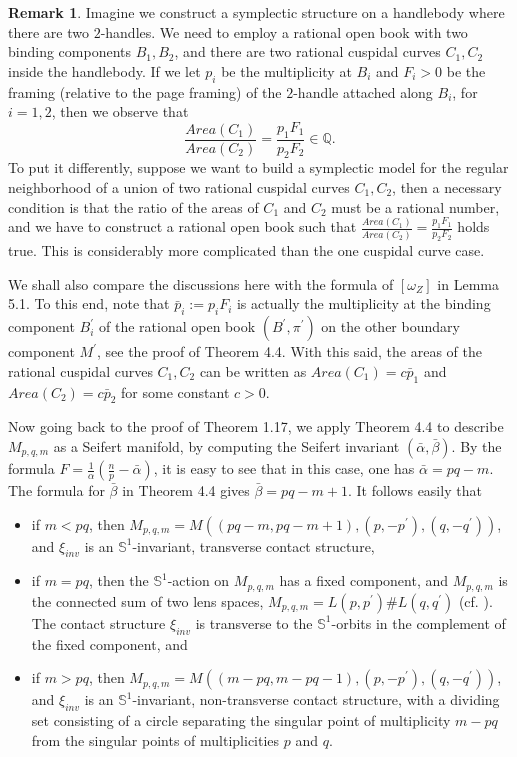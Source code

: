 \documentclass[11pt]{amsart}
\theoremstyle{plain}
\numberwithin{theorem}{section}
\theoremstyle{definition}
\newtheorem{remark}[theorem]{Remark}
\newcommand{\Q}{{\mathbb Q}}
\newcommand{\s}{{\mathbb S}}
\begin{document}
\begin{remark}
Imagine we construct a symplectic structure on a handlebody where there are two $2$-handles. We need to employ 
a rational open book with two binding components $B_1,B_2$, and there are two rational cuspidal curves $C_1,C_2$ inside the handlebody. If we let $p_i$ be the multiplicity at $B_i$ and $F_i>0$ be the framing (relative to the page framing) of the $2$-handle attached along $B_i$, for $i=1,2$, then we observe that
$$
\frac{Area(C_1)}{Area(C_2)}=\frac{p_1 F_1}{p_2 F_2}\in \Q. 
$$
To put it differently, suppose we want to build a symplectic model for the regular neighborhood of a union of two rational cuspidal curves $C_1,C_2$, then a necessary condition is that the ratio of the areas of $C_1$ and
$C_2$ must be a rational number, and we have to construct a rational open book such that 
$\frac{Area(C_1)}{Area(C_2)}=\frac{p_1 F_1}{p_2 F_2}$ holds true. This is considerably more complicated than
the one cuspidal curve case. 

We shall also compare the discussions here with the formula of $[\omega_Z]$ in Lemma 5.1. To this end, note 
that $\bar{p}_i:=p_i F_i$ is actually the multiplicity at the binding component $B_i^\prime$ of the rational open book $(B^\prime,\pi^\prime)$ on the other boundary component $M^\prime$, see the proof of Theorem 4.4. With this 
said, the areas of the rational cuspidal curves $C_1,C_2$ can be written as $Area(C_1)=c\bar{p}_1$
and $Area(C_2)=c\bar{p}_2$ for some constant $c>0$. 

\end{remark}

Now going back to the proof of Theorem 1.17, we apply Theorem 4.4 to describe $M_{p,q,m}$ as a Seifert manifold, by computing the Seifert invariant $(\bar{\alpha},\bar{\beta})$. By the formula $F=\frac{1}{\alpha}(\frac{n}{p}-\bar{\alpha})$, it is easy to see that in this case, one has $\bar{\alpha}=pq-m$. The formula for $\bar{\beta}$ in 
Theorem 4.4 gives $\bar{\beta}=pq-m+1$. It follows easily that
\begin{itemize}
\item if $m<pq$, then $M_{p,q,m}=M((pq-m, pq-m+1), (p,-p^\prime), (q,-q^\prime))$, and $\xi_{inv}$ is
an $\s^1$-invariant, transverse contact structure, 
\item if $m=pq$, then the $\s^1$-action on $M_{p,q,m}$ has a fixed component, and $M_{p,q,m}$ is the connected sum of two lens spaces, $M_{p,q,m}=L(p,p^\prime)\# L(q,q^\prime)$ (cf. \cite{N}). The contact structure 
$\xi_{inv}$ is transverse to the $\s^1$-orbits in the complement of the fixed component, and 
\item if $m>pq$, then $M_{p,q,m}=M((m-pq, m-pq-1), (p,-p^\prime), (q,-q^\prime))$, and $\xi_{inv}$ is
an $\s^1$-invariant, non-transverse contact structure, with a dividing set consisting of a circle separating the singular point of multiplicity $m-pq$ from the singular points of multiplicities $p$ and $q$. 
\end{itemize}
\end{document}
